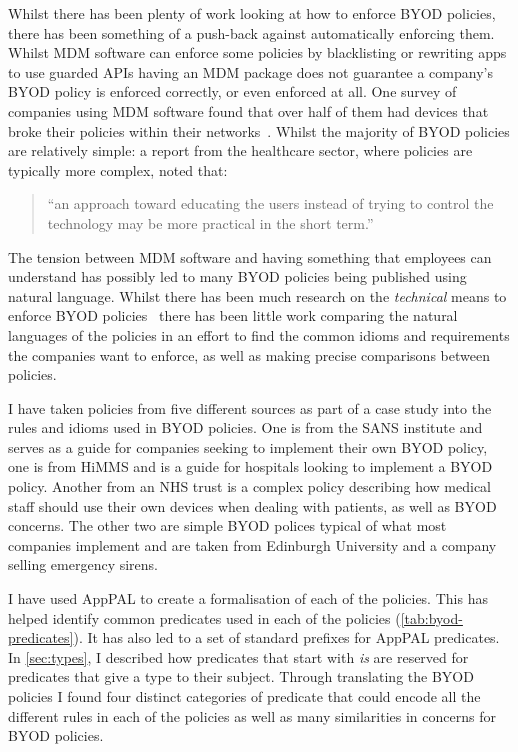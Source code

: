 \documentclass[a4paper]{scrartcl}
\begin{document}
Whilst there has been plenty of work looking at how to enforce BYOD policies,
there has been something of a push-back against automatically enforcing them.
Whilst \ac{MDM} software can enforce some policies by blacklisting or rewriting
apps to use guarded APIs having an \ac{MDM} package does not guarantee a
company's BYOD policy is enforced correctly, or even enforced at all.  One survey of
companies using \ac{MDM} software found that over half of them had devices that
broke their policies within their
networks~\cite{mobileiron_security_labs_q4_2015}.
Whilst the majority of BYOD policies are relatively simple: a report from the
healthcare sector, where policies are typically more complex, noted that:

\begin{quote}
  ``an approach toward educating the users instead of trying to control the
  technology may be more practical in the short term.''~\cite{moyer_managing_2013}
\end{quote}

The tension between \ac{MDM} software and having something that employees can
understand has possibly led to many BYOD policies being published using natural
language. Whilst there has been much research on the \emph{technical} means to
enforce BYOD policies~\cite{martinelli_enhancing_2016,armando_enabling_2014,costantino_towards_2013} there has been little work comparing the natural languages of the
policies in an effort to find the common idioms and requirements the companies
want to enforce, as well as making precise comparisons between policies.

I have taken policies from five different sources as part of a case study into
the rules and idioms used in BYOD policies.  One is from the SANS
institute and serves as a guide for companies seeking to implement their own
BYOD policy, one is from HiMMS and is a guide for hospitals looking to implement
a BYOD policy.  Another from an NHS trust is a complex policy describing
how medical staff should use their own devices when dealing with patients, as
well as BYOD concerns.  The other two are simple BYOD polices typical of what
most companies implement and are taken from Edinburgh University and a company
selling emergency sirens.

I have used AppPAL to create a formalisation of each of the policies. This has
helped identify common predicates used in each of the policies
(\autoref{tab:byod-predicates}). It has also led to a set of
standard prefixes for AppPAL predicates. In \autoref{sec:types}, I described how
predicates that start with \emph{is} are reserved for predicates that give a
type to their subject. Through translating the BYOD policies I found four
distinct categories of predicate that could encode all the different rules in
each of the policies as well as many similarities in concerns for BYOD
policies.
\end{document}
